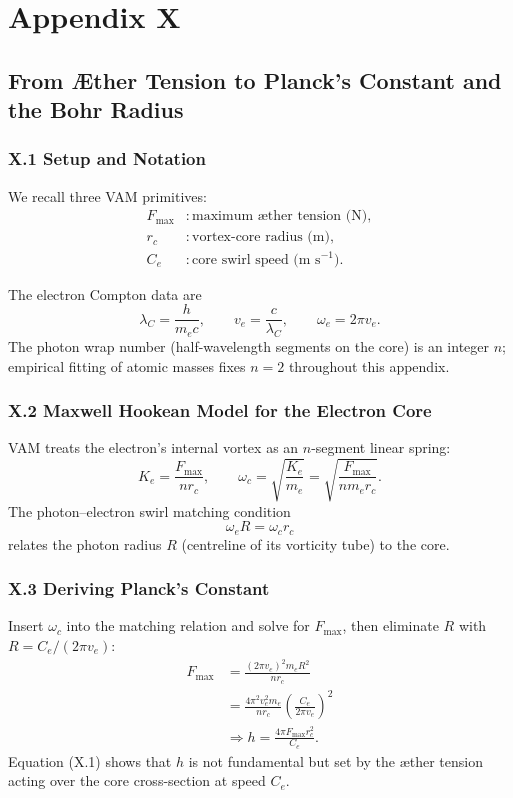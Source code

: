\documentclass[11pt]{article}
\begin{document}
\chapter*{Appendix X}

\section*{From \AE ther Tension to Planck's Constant and the Bohr Radius}

\subsection*{X.1 Setup and Notation}

We recall three VAM primitives:
\begin{align*}
F_{\max} & : \text{maximum \ae ther tension (N)}, \\
r_c & : \text{vortex-core radius (m)}, \\
C_e&:\text{core swirl speed (m s$^{-1}$)}.
\end{align*}

The electron Compton data are
\[
\lambda_C = \frac{h}{m_e c}, \qquad v_e = \frac{c}{\lambda_C}, \qquad \omega_e = 2\pi v_e.
\]
The photon wrap number (half-wavelength segments on the core) is an integer $n$; empirical fitting of atomic masses fixes $n=2$ throughout this appendix.

\subsection*{X.2 Maxwell Hookean Model for the Electron Core}

VAM treats the electron's internal vortex as an $n$-segment linear spring:
\[
K_e = \frac{F_{\max}}{n r_c}, \qquad \omega_c = \sqrt{\frac{K_e}{m_e}} = \sqrt{\frac{F_{\max}}{n m_e r_c}}.
\]
The photon--electron swirl matching condition
\[
\omega_e R = \omega_c r_c
\]
relates the photon radius $R$ (centreline of its vorticity tube) to the core.

\subsection*{X.3 Deriving Planck's Constant}

Insert $\omega_c$ into the matching relation and solve for $F_{\max}$, then eliminate $R$ with $R=C_e/(2\pi v_e)$:
\begin{align*}
F_{\max}
&= \frac{(2\pi v_e)^2 m_e R^2}{n r_c} \\
&= \frac{4\pi^2 v_e^2 m_e}{n r_c} \left( \frac{C_e}{2\pi v_e} \right)^2 \\[4pt]
&\Longrightarrow \boxed{h = \frac{4\pi F_{\max} r_c^2}{C_e}}. \tag{X.1}
\end{align*}
Equation (X.1) shows that $h$ is not fundamental but set by the \ae ther tension acting over the core cross-section at speed $C_e$.
\end{document}

